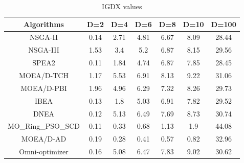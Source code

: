 \documentclass[conference]{IEEEtran}
\begin{document}
\begin{table}[htbp]
\centering
\caption{IGDX values}
\begin{tabular}{@{}ccccccc@{}}
\toprule
Algorithms      & D=2                          & D=4                          & D=6                          & D=8                          & D=10                         & D=100                         \\ \midrule
NSGA-II         & 0.14                         & 2.71                         & 4.81                         & 6.67                         & 8.09                         & 28.44                         \\
NSGA-III        & 1.53                         & 3.4                          & 5.2                          & 6.87                         & 8.15                         & 29.56                         \\
SPEA2           & \cellcolor[HTML]{F8FF00}0.11 & 1.84                         & 4.74                         & 6.87                         & 7.85                         & \cellcolor[HTML]{F8FF00}28.45 \\
MOEA/D-TCH      & 1.17                         & 5.53                         & 6.91                         & 8.13                         & 9.22                         & 31.06                         \\
MOEA/D-PBI      & 1.96                         & 4.96                         & 6.29                         & 7.32                         & 8.26                         & 29.73                         \\
IBEA            & 0.13                         & 1.8                          & 5.03                         & 6.91                         & 7.82                         & 29.52                         \\
DNEA            & 0.12                         & 5.13                         & 6.49                         & 7.69                         & 8.73                         & 30.74                         \\
MO\_Ring\_PSO\_SCD & \cellcolor[HTML]{F8FF00}0.11 & 0.33                         & 0.68                         & 1.13                         & 1.9                          & 44.08                         \\
MOEA/D-AD       & 0.19                         & \cellcolor[HTML]{F8FF00}0.28 & \cellcolor[HTML]{F8FF00}0.41 & \cellcolor[HTML]{F8FF00}0.57 & \cellcolor[HTML]{F8FF00}0.82 & 32.96                         \\
Omni-optimizer  & 0.16                         & 5.08                         & 6.47                         & 7.83                         & 9.02                         & 30.62                         \\ \bottomrule
\end{tabular}
\label{table: IGDX sumup}
\end{table}
\end{document}
